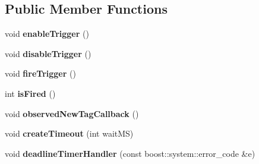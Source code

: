 \subsection*{Public Member Functions}
\begin{DoxyCompactItemize}
\item 
\hypertarget{class_e_l_f_i_n_1_1_abstract_trigger_a5633a30d5723b97c8474e7421151e473}{void {\bfseries enable\-Trigger} ()}\label{class_e_l_f_i_n_1_1_abstract_trigger_a5633a30d5723b97c8474e7421151e473}

\item 
\hypertarget{class_e_l_f_i_n_1_1_abstract_trigger_ac70002a59acc7aee6947f946f3387eb2}{void {\bfseries disable\-Trigger} ()}\label{class_e_l_f_i_n_1_1_abstract_trigger_ac70002a59acc7aee6947f946f3387eb2}

\item 
\hypertarget{class_e_l_f_i_n_1_1_abstract_trigger_a5c614add4625141d220645268afcf2c6}{void {\bfseries fire\-Trigger} ()}\label{class_e_l_f_i_n_1_1_abstract_trigger_a5c614add4625141d220645268afcf2c6}

\item 
\hypertarget{class_e_l_f_i_n_1_1_abstract_trigger_aadea65da88b0ceb8d807e5e5863e1ad6}{int {\bfseries is\-Fired} ()}\label{class_e_l_f_i_n_1_1_abstract_trigger_aadea65da88b0ceb8d807e5e5863e1ad6}

\item 
\hypertarget{class_e_l_f_i_n_1_1_abstract_trigger_a5e82d5eb6d1380e22569eb528c1f86fc}{void {\bfseries observed\-New\-Tag\-Callback} ()}\label{class_e_l_f_i_n_1_1_abstract_trigger_a5e82d5eb6d1380e22569eb528c1f86fc}

\item 
\hypertarget{class_e_l_f_i_n_1_1_abstract_trigger_a34a7e5a8fd3e3482b5e17e3369360d42}{void {\bfseries create\-Timeout} (int wait\-M\-S)}\label{class_e_l_f_i_n_1_1_abstract_trigger_a34a7e5a8fd3e3482b5e17e3369360d42}

\item 
\hypertarget{class_e_l_f_i_n_1_1_abstract_trigger_a503210754bef556363fdf0bad5a4a214}{void {\bfseries deadline\-Timer\-Handler} (const boost\-::system\-::error\-\_\-code \&e)}\label{class_e_l_f_i_n_1_1_abstract_trigger_a503210754bef556363fdf0bad5a4a214}

\end{DoxyCompactItemize}
